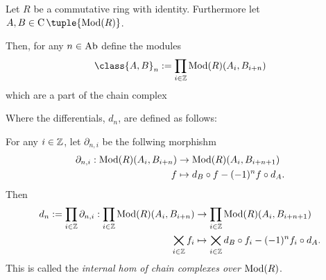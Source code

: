 \begin{definition}
    \label{def:internal_hom_of_chain_complexes_over_Mod(R)}
    Let \( R \) be a commutative ring with identity. Furthermore let \( A, B \in \C \tuple{\Mod(R)} \).

    Then, for any \( n \in \operatorname{Ab} \) define the modules
    \[
        \class{A, B}_n := \prod_{i \in \Zb} \Mod(R)(A_i, B_{i + n})
    \]
    which are a part of the chain complex
    \begin{center}
    \end{center}

    Where the differentials, \( d_n \), are defined as follows:
    
    For any \( i \in {\mathbb{Z}} \), let \( \partial_{n, i} \) be the follwing morphishm
    \begin{align*}
        \partial_{n, i} : \operatorname{Mod}(R)(A_i, B_{i + n}) &\to \operatorname{Mod}(R)(A_i, B_{i + n + 1}) \\
        f &\mapsto d_B \circ f - (-1)^n f \circ d_A.
    \end{align*}
    Then
    \begin{align*}
        d_n := \prod_{i \in {\mathbb{Z}}} \partial_{n, i}: \prod_{i \in {\mathbb{Z}}} \operatorname{Mod}(R)(A_i, B_{i + n}) &\to \prod_{i \in {\mathbb{Z}}} \operatorname{Mod}(R)(A_i, B_{i + n + 1}) \\
        \bigtimes_{i \in {\mathbb{Z}}} f_i &\mapsto \bigtimes_{i \in {\mathbb{Z}}} d_B \circ f_i - (-1)^n f_i \circ d_A.
    \end{align*}
    This is called the \emph{internal hom of chain complexes over \( \operatorname{Mod}(R) \)}.
\end{definition}

